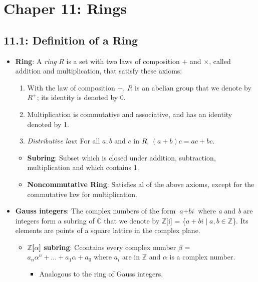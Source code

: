 \documentclass[12pt]{article}
\begin{document}
\section*{Chaper 11: Rings}

\subsection*{11.1: Definition of a Ring}
\begin{itemize}
  \item \textbf{Ring}: A \textit{ring} $R$ is a set with two laws of composition $+$ and $\times$, called addition and multiplication, that satisfy these axioms:
  \begin{enumerate}
    \begin{enumerate}
      \item With the law of composition $+$, $R$ is an abelian group that we denote by $R^+$; its identity is denoted by 0.
      \item Multiplication is commutative and associative, and has an identity denoted by 1.
      \item \textit{Distributive law}: For all $a, b$ and $c$ in $R$, $(a + b)c = ac + bc$.
    \end{enumerate}
  \end{enumerate}
  \begin{itemize}
    \item \textbf{Subring}: Subset which is closed under addition, subtraction, multiplication and which contains 1.
    \item \textbf{Noncommutative Ring}: Satisfies al of the above axioms, except for the commutative law for multiplication.
  \end{itemize}
  \item \textbf{Gauss integers}: The complex numbers of the form $\textit{a} + \textit{bi}$ where \textit{a} and \textit{b} are integers form a subring of $\mathbb{C}$ that we denote by $\mathbb{Z}$[i] = \{$\textit{a} + \textit{bi} \mid \textit{a}, \textit{b} \in \mathbb{Z}$\}. Its elements are points of a square lattice in the complex plane.
  \begin{itemize}
    \item \textbf{$\mathbb{Z}$[$\alpha$] subring}: Ccontains every complex number $\beta$ = $a_n\alpha^n + ... + a_1\alpha + a_0$ where $a_i$ are in $\mathbb{Z}$ and $\alpha$ is a complex number.
    \begin{itemize}
      \item Analogous to the ring of Gauss integers.

\end{itemize}
\end{itemize}
\end{itemize}
\end{document}
